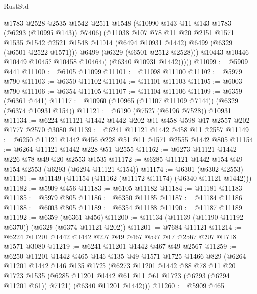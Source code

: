 \begin{lexlean}{RustStd}
\begin{coremodule}
{{                  @1783
                  @2528
                  @2535
                  @1542
                  @2511
                  @1548
                  (@10990 @143 @11 @143 @1783 (@6293 (@10995 @143)) @7406)
                  (@11038
                    @107
                    @78
                    @11
                    @20
                    @2151
                    @1571
                    @1535
                    @1542
                    @2521
                    @1548
                    @11014
                    (@6494 @10931 @1442)
                    @6499
                    (@6329 (@6501 @2522 @1571)))
                  @6499
                  (@6329 (@6501 @2512 @2528)))
                @10443
                @10446
                @10449
                @10453
                @10458
                @10464))
            (@6340 @10931 @1442)))))
@11099 := @5909 @441
@11100 := @6105 @11099
@11101 := @11098 @11100
@11102 := @5979 @790
@11103 := @6350 @11102
@11104 := @11101 @11103
@11105 := @6003 @790
@11106 := @6354 @11105
@11107 := @11104 @11106
@11109 := @6359 (@6361 @441)
@11117 := @10960 (@10965 (@11107 @11109 @7144)) (@6329 (@6374 @10931 @154))
@11121 := @6190 (@7527 (@6196 @7528)) @10931
@11134 := @6224 @11121 @1442 @1442 @202 @11 @458 @598 @17 @2557 @202 @1777 @2570 @3080
@11139 := @6241 @11121 @1442 @458 @11 @2557
@11149 := @6250 @11121 @1442 @456 @228 @51 @11 @1571 @2555 @1442 @805
@11154 := @6264 @11121 @1442 @228 @51 @2555
@11162 := @6273 @11121 @1442 @226 @78 @49 @20 @2553 @1535
@11172 := @6285 @11121 @1442 @154 @49 @154 @2553 (@6293 (@6294 @11121 @154))
@11174 := @6301 (@6302 @2553)
@11181 := @11149 (@11154 (@11162 (@11172 @11174) (@6340 @11121 @1442)))
@11182 := @5909 @456
@11183 := @6105 @11182
@11184 := @11181 @11183
@11185 := @5979 @805
@11186 := @6350 @11185
@11187 := @11184 @11186
@11188 := @6003 @805
@11189 := @6354 @11188
@11190 := @11187 @11189
@11192 := @6359 (@6361 @456)
@11200 := @11134 (@11139 (@11190 @11192 @6370)) (@6329 (@6374 @11121 @202))
@11201 := @7684 @11121
@11214 := @6224 @11201 @1442 @1442 @207 @49 @467 @597 @17 @2567 @207 @1718 @1571 @3080
@11219 := @6241 @11201 @1442 @467 @49 @2567
@11259 := @6250
    @11201
    @1442
    @465
    @146
    @135
    @49
    @1571
    @1725
    @1466
    @829
    (@6264
      @11201
      @1442
      @146
      @135
      @1725
      (@6273
        @11201
        @1442
        @88
        @78
        @11
        @20
        @1723
        @1535
        (@6285 @11201 @1442 @61 @11 @61 @1723 (@6293 (@6294 @11201 @61)) @7121)
        (@6340 @11201 @1442)))
@11260 := @5909 @465
}}
\end{coremodule}
\end{lexlean}
